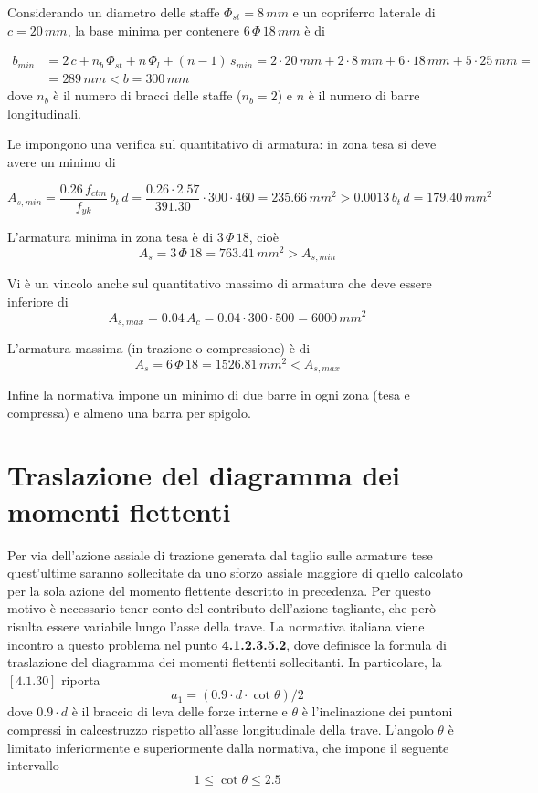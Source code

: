 Considerando un diametro delle staffe $\Phi_{st} = 8\,mm$ e un copriferro laterale di $c = 20\,mm$, la base minima per contenere $6\,\Phi\,18\,mm$ è di

\begin{align*}
	b_{min} &= 2\,c + n_b\,\Phi_{st} + n\,\Phi_l + (n-1)\,s_{min} = 2\cdot 20\,mm + 2\cdot 8\,mm + 6\cdot 18\,mm + 5\cdot 25\,mm =\\
	&=289\,mm < b = 300\,mm
\end{align*}
dove $n_b$ è il numero di bracci delle staffe ($n_b = 2$) e $n$ è il numero di barre longitudinali.

Le \ntc impongono una verifica sul quantitativo di armatura: in zona tesa si deve avere un minimo di 

\[
A_{s,min} = \dfrac{0.26\,f_{ctm}}{f_{yk}}\,b_t\,d = \dfrac{0.26\cdot 2.57}{391.30}\cdot 300\cdot 460 = 235.66\,mm^2 > 0.0013\,b_t\,d = 179.40\,mm^2
\]

L'armatura minima in zona tesa è di $3\,\Phi\,18$, cioè 
\[
A_s = 3\,\Phi\,18 = 763.41\,mm^2 > A_{s,min}
\]

Vi è un vincolo anche sul quantitativo massimo di armatura che deve essere inferiore di 
\[
A_{s,max} = 0.04\,A_c = 0.04\cdot 300\cdot 500 = 6000\,mm^2
\]

L'armatura massima (in trazione o compressione) è di
\[
A_s = 6\,\Phi\,18 = 1526.81\,mm^2 < A_{s,max}
\]

Infine la normativa impone un minimo di due barre in ogni zona (tesa e compressa) e almeno una barra per spigolo. 


\section{Traslazione del diagramma dei momenti flettenti}\label{sec:traslazioneMomenti}
Per via dell'azione assiale di trazione generata dal taglio sulle armature tese quest'ultime saranno sollecitate da uno sforzo assiale maggiore di quello calcolato per la sola azione del momento flettente descritto in precedenza. Per questo motivo è necessario tener conto del contributo dell'azione tagliante, che però risulta essere variabile lungo l'asse della trave. La normativa italiana viene incontro a questo problema nel punto \textbf{4.1.2.3.5.2}, dove definisce la formula di traslazione del diagramma dei momenti flettenti sollecitanti. In particolare, la \textit{$[4.1.30]$} riporta
\[
    a_1 = (0.9\cdot d\cdot \cot\theta)/2
\]
dove $0.9\cdot d$ è il braccio di leva delle forze interne e $\theta$ è l'inclinazione dei puntoni compressi in calcestruzzo rispetto all'asse longitudinale della trave. L'angolo $\theta$ è limitato inferiormente e superiormente dalla normativa, che impone il seguente intervallo
\[
    1\leq \cot\theta\leq 2.5
\]

